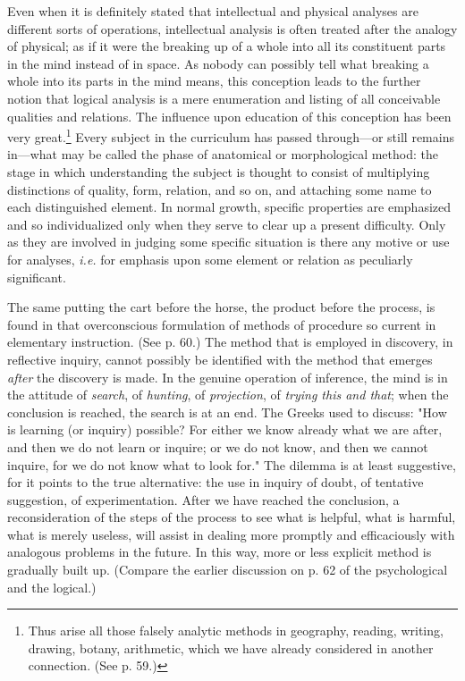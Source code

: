 \documentclass[letterpaper]{book}
\begin{document}


Even when it is definitely stated that intellectual and physical
analyses are different sorts of operations, intellectual analysis is
often treated after the analogy of physical; as if it were the breaking
up of a whole into all its constituent parts in the mind instead of in
space. As nobody can possibly tell what breaking a whole into its parts
in the mind means, this conception leads to the further notion that
logical analysis is a mere enumeration and listing of all conceivable
qualities and
relations.
The influence upon education of this conception has been very
great.\footnote{
Thus arise all those falsely analytic methods in geography, reading,
writing, drawing, botany, arithmetic, which we have already considered
in another connection. (See p. 59.)
}
Every subject in the curriculum has passed through---or still remains
in---what may be called the phase of anatomical or morphological method:
the stage in which understanding the subject is thought to consist of
multiplying distinctions of quality, form, relation, and so on, and
attaching some name to each distinguished element. In normal growth,
specific properties are emphasized and so individualized only when they
serve to clear up a present difficulty. Only as they are involved in
judging some specific situation is there any motive or use for analyses,
\emph{i.e.} for emphasis upon some element or relation as peculiarly
significant.


The same putting the cart before the horse, the product before the
process, is found in that overconscious formulation of methods of
procedure so current in elementary instruction. (See p. 60.) The method
that is employed in discovery, in reflective inquiry, cannot possibly be
identified with the method that emerges \emph{after} the discovery is
made. In the genuine operation of inference, the mind is in the attitude
of \emph{search}, of \emph{hunting}, of \emph{projection}, of
\emph{trying this and that}; when the conclusion is reached, the search
is at an end. The Greeks used to discuss: "How is learning (or inquiry)
possible? For either we know already what we are after, and then we do
not learn or inquire; or we do not know, and then we cannot inquire, for
we do not know what to look for." The dilemma is at least suggestive,
for it points to the true alternative: the use in inquiry of doubt, of
tentative suggestion, of
experimentation.
After we have reached the conclusion, a reconsideration of the steps of
the process to see what is helpful, what is harmful, what is merely
useless, will assist in dealing more promptly and efficaciously with
analogous problems in the future. In this way, more or less explicit
method is gradually built up. (Compare the earlier discussion on p. 62
of the psychological and the logical.)
\end{document}
